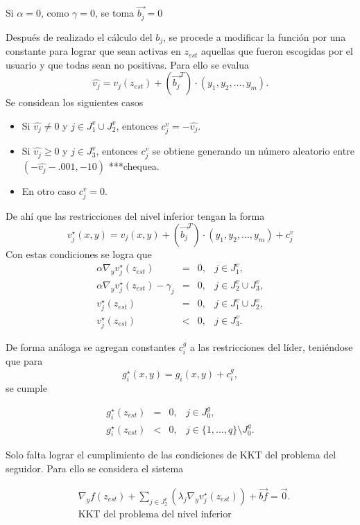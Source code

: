 Si $\alpha=0$, como $\gamma=0$, se toma  $\vec{b_j}=0$
            
Después de realizado el cálculo del $b_j$, se procede a modificar la función por una constante para lograr que sean activas en $z_{est}$ aquellas que fueron escogidas por el usuario y que todas sean no positivas. Para ello se evalua $$\hat{v_j}=v_{j}(z_{est})+ ({\vec{b_j}}^T)\cdot (y_1,y_2,\dots,y_m).$$ Se considean los siguientes casos
\begin{itemize}
    \item Si $\hat{v_j}\neq 0$ y $j\in J_1^v\cup J_2^v$, entonces $c_j^v=-\hat{v_j}$.
\item Si $\hat{v_j}\geq 0$ y $j\in J_3^v$,  entonces  $c_j^v$ se obtiene generando un número aleatorio entre $(-\hat{v_j}-.001, -10)$ ***chequea.
\item En otro caso $c_j^v=0$.\end{itemize}

De ahí que las restricciones del nivel inferior tengan la forma 
\begin{equation}
	v_{j}^{\star}(x,y)=v_{j}(x,y)+ ({\vec{b_j}}^T)\cdot (y_1,y_2,\dots,y_m)+c_j^v
\end{equation}
%
Con estas condiciones se logra que 
$$\begin{array}{rcll} \alpha \nabla_y v_{j}^{\star}(z_{est})&=&0,& j\in J_1^v,\\ \alpha \nabla_y v_{j}^{\star}(z_{est})-\gamma_j&=&0,& j\in J_2^v\cup J_3^v,\\
  v_{j}^{\star}(z_{est})&=&0,& j\in J_1^v\cup J_2^v, \\  v_{j}^{\star}(z_{est})&<&0,& j\in J_3^v.\end{array}$$

De forma análoga se agregan constantes  $c_i^g$  a las restricciones del líder,  teniéndose que para $$g_{i}^{\star}(x,y)=g_{i}(x,y)+c_i^g,$$ se cumple

$$\begin{array}{rcll} 
  g_{i}^{\star}(z_{est})&=&0,& j\in J_0^g,\\  g_{i}^{\star}(z_{est})&<&0,& j\in \{1, \ldots, q\}\setminus J_0^g.\end{array}$$

Solo falta lograr el cumplimiento de las condiciones de KKT del problema del seguidor. Para ello se considera el sistema 

\begin{equation}
    \begin{aligned}
        &\nabla_{y}f(z_{est})+\sum_{j \in J_2^v}(\lambda_j\nabla_{y}v_{j}^{\star}(z_{est}))+\vec{bf}=\vec{0}.\\
        &\text{KKT del problema del nivel inferior}
    \end{aligned}
    \label{KKT_nivel_inferior}
\end{equation}

